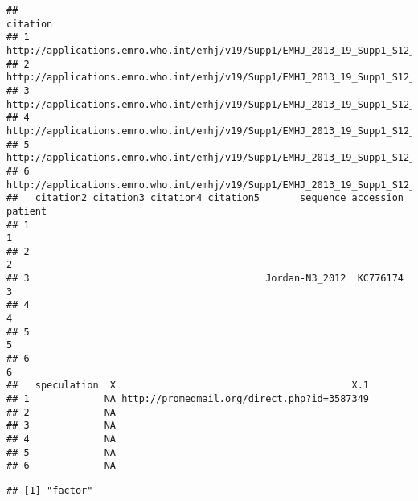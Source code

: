 \documentclass[]{article}
\newenvironment{Shaded}{\begin{snugshade}}{\end{snugshade}}
\newcommand{\KeywordTok}[1]{\textcolor[rgb]{0.13,0.29,0.53}{\textbf{{#1}}}}
\newcommand{\DecValTok}[1]{\textcolor[rgb]{0.00,0.00,0.81}{{#1}}}
\newcommand{\StringTok}[1]{\textcolor[rgb]{0.31,0.60,0.02}{{#1}}}
\newcommand{\NormalTok}[1]{{#1}}
\begin{document}
\begin{verbatim}
##                                                                         citation
## 1 http://applications.emro.who.int/emhj/v19/Supp1/EMHJ_2013_19_Supp1_S12_S18.pdf
## 2 http://applications.emro.who.int/emhj/v19/Supp1/EMHJ_2013_19_Supp1_S12_S18.pdf
## 3 http://applications.emro.who.int/emhj/v19/Supp1/EMHJ_2013_19_Supp1_S12_S18.pdf
## 4 http://applications.emro.who.int/emhj/v19/Supp1/EMHJ_2013_19_Supp1_S12_S18.pdf
## 5 http://applications.emro.who.int/emhj/v19/Supp1/EMHJ_2013_19_Supp1_S12_S18.pdf
## 6 http://applications.emro.who.int/emhj/v19/Supp1/EMHJ_2013_19_Supp1_S12_S18.pdf
##   citation2 citation3 citation4 citation5       sequence accession patient
## 1                                                                        1
## 2                                                                        2
## 3                                         Jordan-N3_2012  KC776174       3
## 4                                                                        4
## 5                                                                        5
## 6                                                                        6
##   speculation  X                                         X.1
## 1             NA http://promedmail.org/direct.php?id=3587349
## 2             NA                                            
## 3             NA                                            
## 4             NA                                            
## 5             NA                                            
## 6             NA
\end{verbatim}

\begin{Shaded}
\end{Shaded}

\begin{verbatim}
## [1] "factor"
\end{verbatim}

\begin{Shaded}
\end{Shaded}
\end{document}
